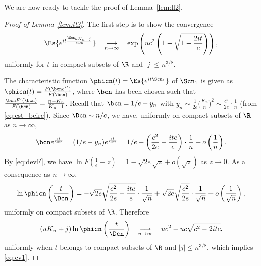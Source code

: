 We are now ready to tackle the proof of Lemma~\ref{lem:ll2}.
\begin{proof}[Proof of Lemma~\ref{lem:ll2}]
The first step is to show the convergence
\begin{equation}
\label{eq:cv1}\Es{e^{i t \frac{\Scn_{ u K_{n} +j}}{ \Dcn }}}  \quad \mathop{\longrightarrow}_{n \rightarrow \infty} \quad \exp \left( u c^{2} \left( 1 -\sqrt{1-  \frac{2it}{c}}  \right)  \right),
\end{equation}
uniformly for $t$ in compact subsets of $\R$ and $|j| \leq n^{3/8}$.

The characteristic function $\phicn(t)=\Es{e^{it\Scn_{1}}}$  of $\Scn_{1}$
is given as $\phicn(t)= \frac{F( \bcn e^{it})}{F(\bcn)}$,
where $\bcn$ has been chosen such that $ \frac{\bcn F'(\bcn)}{F(\bcn)}= \frac{n-K_{n}}{K_{n}+1}$.
Recall that $\bcn=1/e-y_{n}$ with
\hbox{$y_{n} \sim \frac{1}{2e}  \big( \frac{K_{n}}{n} \big)^{2} \sim \frac{c^{2}}{2e} \cdot \frac{1}{n}$}
(from \eqref{eq:est_bcirc}).
Since $ \Dcn \sim  n /c$, we have, uniformly on compact subsets of $\R$ as $n \rightarrow \infty$,
\[\bcn e^{ \frac{it}{\Dcn}}=(1/e-y_{n})e^{ \frac{it}{\Dcn}}=1/e-  \left( \frac{c^{2}}{2e} - \frac{it c}{e } \right) \cdot \frac{1}{{n}}+o \left(  \frac{1}{n} \right).\]
By \eqref{eq:devF}, we have $ \ln F \left( \frac{1}{e}-z \right)= 1-\sqrt{2e} \sqrt{z}+o(\sqrt{z})$ as $z \rightarrow 0$.
As a consequence as $n \rightarrow \infty$, \[\ln \phicn \left( \frac{t}{ \Dcn } \right)=-\sqrt{2e} \sqrt{ \frac{c^{2}}{2e} - \frac{it c}{e}} \cdot \frac{1}{\sqrt{n}} + \sqrt{2e} \sqrt{ \frac{c^{2}}{2e}} \cdot \frac{1}{\sqrt{n}}+o \left(  \frac{1}{\sqrt{n}} \right),\]
 uniformly on compact subsets of $\R$. Therefore
\[( uK_{n}  +j) \ln \phicn \left( \frac{t}{\Dcn} \right)  \quad \mathop{\longrightarrow}_{n \rightarrow \infty} \quad u c^{2}-uc \sqrt{c^{2}- 2itc},\]
 uniformly when $t$ belongs to compact subsets of $\R$ and $|j| \leq n^{3/8}$, which implies \eqref{eq:cv1}.


\end{proof}
